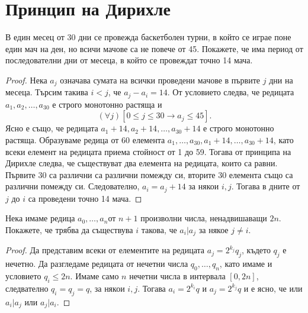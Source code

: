 \section{Принцип на Дирихле}
\begin{problem}
  В един месец от 30 дни се провежда баскетболен турни, в който се играе поне един мач на ден, но всичи мачове са не повече от 45.
  Покажете, че има период от последователни дни от месеца, в който се провеждат точно 14 мача.
\end{problem}
\begin{proof}
  Нека $a_j$ означава сумата на всички проведени мачове в първите $j$ дни на месеца.
  Търсим такива $i<j$, че $a_j - a_i = 14$.
  От условието следва, че редицата $a_1,a_2,\dots, a_{30}$ е строго монотонно растяща и
  \[(\forall j)[0\leq j\leq 30 \rightarrow a_j \leq 45].\]
  Ясно е също, че редицата $a_1+14,a_2+14,\dots,a_{30}+14$ е строго монотонно растяща.
  Образуваме редица от 60 елемента $a_1,\dots,a_{30},a_1+14,\dots,a_{30}+14$, като 
  всеки елемент на редицата приема стойност от 1 до 59.
  Тогава от принципа на Дирихле следва, че съществуват два елемента на редицата, които са равни.
  Първите 30 са различни са различни помежду си, вторите 30 елемента също са различни помежду си.
  Следователно, $a_i = a_j + 14$ за някои $i,j$.
  Тогава в дните от $j$ до $i$ са проведени точно 14 мача.
\end{proof}

\begin{problem}
  Нека имаме редица $a_0,\dots,a_n$от $n+1$ произволни числа, ненадвишаващи $2n$.
  Покажете, че трябва да съществува $i$ такова, че $a_i\vert a_j$ за някое $j\neq i$.
\end{problem}
\begin{proof}
  Да представим всеки от елементите на редицата $a_j = 2^{k_j}q_j$, където $q_j$ е нечетно.
  Да разгледаме редицата от нечетни числа $q_0,\dots,q_n$, като имаме и условието $q_i \leq 2n$.
  Имаме само $n$ нечетни числа в интервала $[0,2n]$, следвателно $q_i = q_j = q$, за някои $i,j$.
  Тогава $a_i = 2^{k_i}q$ и $a_j = 2^{k_j}q$ и е ясно, че или $a_i\vert a_j$ или $a_j\vert a_i$.  
\end{proof}

